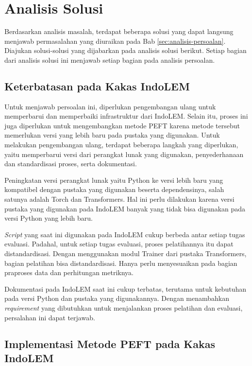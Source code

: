 \section{Analisis Solusi}

Berdasarkan analisis masalah, terdapat beberapa solusi yang dapat langsung menjawab permasalahan yang diuraikan pada Bab \ref{sec:analisis-persoalan}. Diajukan solusi-solusi yang dijabarkan pada analisis solusi berikut. Setiap bagian dari analisis solusi ini  menjawab setiap bagian pada analisis persoalan.

\subsection{Keterbatasan pada Kakas IndoLEM}

Untuk menjawab persoalan ini, diperlukan pengembangan ulang untuk memperbarui dan memperbaiki infrastruktur dari IndoLEM. Selain itu, proses ini juga diperlukan untuk mengembangkan metode PEFT karena metode tersebut memerlukan versi yang lebih baru pada pustaka yang digunakan. Untuk melakukan pengembangan ulang, terdapat beberapa langkah yang diperlukan, yaitu memperbarui versi dari perangkat lunak yang digunakan, penyederhanaan dan standardisasi proses, serta dokumentasi.

Peningkatan versi perangkat lunak yaitu Python ke versi lebih baru yang kompatibel dengan pustaka yang  digunakan beserta dependensinya, salah satunya adalah Torch dan Transformers. Hal ini perlu dilakukan karena versi pustaka yang digunakan pada IndoLEM banyak yang tidak bisa digunakan pada versi Python yang lebih baru.

\textit{Script} yang saat ini digunakan pada IndoLEM cukup berbeda antar setiap tugas evaluasi. Padahal, untuk setiap tugas evaluasi, proses pelatihannya itu dapat distandardisasi. Dengan menggunakan modul Trainer dari pustaka Transformers, bagian pelatihan bisa distandardisasi. Hanya perlu menyesuaikan pada bagian praproses data dan perhitungan metriknya.

Dokumentasi pada IndoLEM saat ini cukup terbatas, terutama untuk kebutuhan pada versi Python dan pustaka yang digunakannya. Dengan menambahkan \textit{requirement} yang dibutuhkan untuk menjalankan proses pelatihan dan evaluasi, persalahan ini dapat terjawab.

\subsection{Implementasi Metode PEFT pada Kakas IndoLEM}

